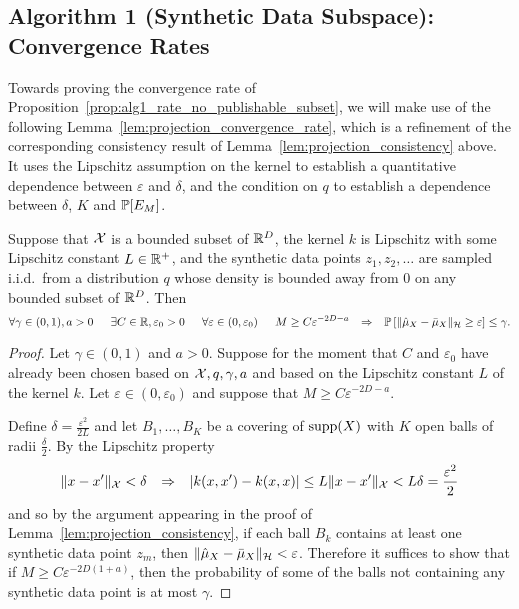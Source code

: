 \subsection{Algorithm 1 (Synthetic Data Subspace): Convergence Rates}
\label{app:sec:synthetic_subspace_convergence_rates}

Towards proving the convergence rate of Proposition~\ref{prop:alg1_rate_no_publishable_subset}, we will make use of the following Lemma~\ref{lem:projection_convergence_rate}, which is a refinement of the corresponding consistency result of Lemma~\ref{lem:projection_consistency} above. It uses the Lipschitz assumption on the kernel to establish a quantitative dependence between $\varepsilon$ and $\delta$, and the condition on $q$ to establish a dependence between $\delta$, $K$ and $\mathbb{P}[E_M]$.

\begin{lemma}
\label{lem:projection_convergence_rate}
Suppose that $\mathcal{X}$ is a bounded subset of $\mathbb{R}^D$, the kernel $k$ is Lipschitz with some Lipschitz constant $L \in \mathbb{R}^{+}$, and the synthetic data points $z_1, z_2, \ldots$ are sampled i.i.d.~from a distribution $q$ whose density is bounded away from $0$ on any bounded subset of $\mathbb{R}^D$. Then
\begin{equation*}
\forall{\gamma \in (0, 1), a > 0}
\hspace{1.5em}
\exists{C \in \mathbb{R}, \varepsilon_0 > 0}
\hspace{1.5em}
\forall{\varepsilon \in (0, \varepsilon_0)}
\hspace{1.5em}
M \geq C \varepsilon^{-2D-a}
\hspace{0.75em} \Rightarrow \hspace{0.75em}
\mathbb{P}\left[ \| \hat{\mu}_X - \bar{\mu}_X \|_{\mathcal{H}} \geq \varepsilon \right]
\leq
\gamma
.
\end{equation*}
\begin{proof}
Let $\gamma \in (0, 1)$ and $a > 0$.
Suppose for the moment that $C$ and $\varepsilon_0$ have already been chosen based on $\mathcal{X}, q, \gamma, a$ and based on the Lipschitz constant $L$ of the kernel $k$. Let $\varepsilon \in (0, \varepsilon_0)$ and suppose that $M \geq C \varepsilon^{-2D-a}$.

Define $\delta = \frac{\varepsilon^2}{2L}$ and let $B_1, \ldots, B_K$ be a covering of $\operatorname{supp}(X)$ with $K$ open balls of radii $\frac{\delta}{2}$. By the Lipschitz property
\begin{equation*}
\| x - x' \|_{\mathcal{X}} < \delta
\hspace{0.75em}\Rightarrow\hspace{0.75em}
|k(x, x') - k(x, x)|
\leq L \| x - x' \|_{\mathcal{X}}
< L \delta
= \frac{\varepsilon^2}{2}
\end{equation*}
and so by the argument appearing in the proof of Lemma~\ref{lem:projection_consistency}, if each ball $B_k$ contains at least one synthetic data point $z_m$, then $\| \hat{\mu}_X - \bar{\mu}_X \|_{\mathcal{H}} < \varepsilon$. Therefore it suffices to show that if $M \geq C \varepsilon^{-2D(1+a)}$, then the probability of some of the balls not containing any synthetic data point is at most $\gamma$.


\end{proof}
\end{lemma}
